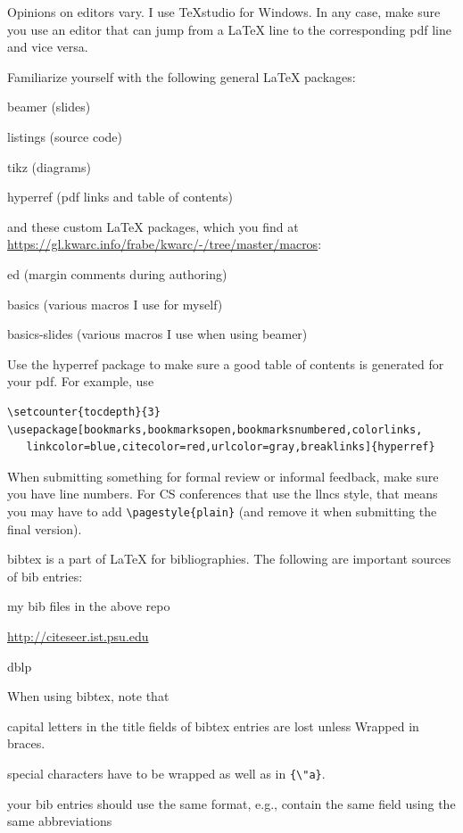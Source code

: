 \documentclass[12pt]{article}
\begin{document}
Opinions on editors vary. I use TeXstudio for Windows.
In any case, make sure you use an editor that can jump from a LaTeX line to the corresponding pdf line and vice versa.
\medskip

Familiarize yourself with the following general LaTeX packages:
\begin{compactitem}
\item beamer (slides)
\item listings (source code)
\item tikz (diagrams)
\item hyperref (pdf links and table of contents)
\end{compactitem}
and these custom LaTeX packages, which you find at \url{https://gl.kwarc.info/frabe/kwarc/-/tree/master/macros}:
\begin{compactitem}
\item ed (margin comments during authoring)
\item basics (various macros I use for myself)
\item basics-slides (various macros I use when using beamer)
\end{compactitem}
\medskip

Use the hyperref package to make sure a good table of contents is generated for your pdf.
For example, use
\begin{verbatim}
\setcounter{tocdepth}{3}
\usepackage[bookmarks,bookmarksopen,bookmarksnumbered,colorlinks,
   linkcolor=blue,citecolor=red,urlcolor=gray,breaklinks]{hyperref}
\end{verbatim}
\medskip

When submitting something for formal review or informal feedback, make sure you have line numbers.
For CS conferences that use the llncs style, that means you may have to add \verb|\pagestyle{plain}| (and remove it when submitting the final version).

bibtex is a part of LaTeX for bibliographies.
The following are important sources of bib entries:
\begin{compactitem}
\item my bib files in the above repo
\item \url{http://citeseer.ist.psu.edu}
\item dblp
\end{compactitem}
When using bibtex, note that
\begin{compactitem}
\item capital letters in the title fields of bibtex entries are lost unless {W}rapped in braces.
\item special characters have to be wrapped as well as in \verb|{\"a}|.
\item your bib entries should use the same format, e.g., contain the same field using the same abbreviations
\end{compactitem}
\end{document}
